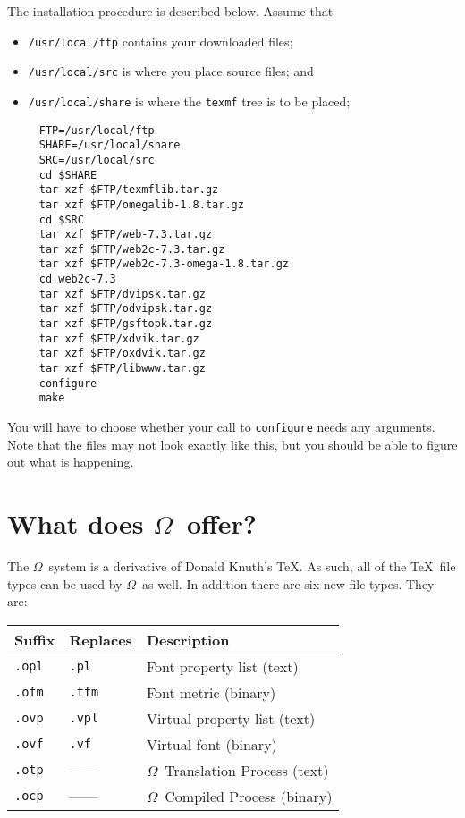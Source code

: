 \documentclass[fleqn]{article}
\newcommand{\OMEGA}{$\Omega$}
\begin{document}
The installation procedure is described below.  Assume that
\begin{itemize}
\item \verb|/usr/local/ftp| contains your downloaded files;
\item \verb|/usr/local/src| is where you place source files; and
\item \verb|/usr/local/share| is where the \texttt{texmf} tree is
to be placed;
\end{itemize}
\begin{verbatim}
     FTP=/usr/local/ftp
     SHARE=/usr/local/share
     SRC=/usr/local/src
     cd $SHARE
     tar xzf $FTP/texmflib.tar.gz
     tar xzf $FTP/omegalib-1.8.tar.gz
     cd $SRC
     tar xzf $FTP/web-7.3.tar.gz
     tar xzf $FTP/web2c-7.3.tar.gz
     tar xzf $FTP/web2c-7.3-omega-1.8.tar.gz
     cd web2c-7.3
     tar xzf $FTP/dvipsk.tar.gz
     tar xzf $FTP/odvipsk.tar.gz
     tar xzf $FTP/gsftopk.tar.gz
     tar xzf $FTP/xdvik.tar.gz
     tar xzf $FTP/oxdvik.tar.gz
     tar xzf $FTP/libwww.tar.gz
     configure
     make
\end{verbatim}
You will have to choose whether your call to \texttt{configure}
needs any arguments.  Note that the files may not look exactly
like this, but you should be able to figure out what is happening.

\section{What does \OMEGA\ offer?}

The \OMEGA\ system is a derivative of Donald Knuth's \TeX.  As such,
all of the \TeX\ file types can be used by \OMEGA\ as well.  In
addition there are six new file types.  They are:
\vspace*{.2cm}

\begin{tabular}{lll}
Suffix & Replaces & Description\\
\hline
\texttt{.opl} & \texttt{.pl} & Font property list (text)\\
\texttt{.ofm} & \texttt{.tfm} & Font metric (binary)\\
\texttt{.ovp} & \texttt{.vpl} & Virtual property list (text)\\
\texttt{.ovf} & \texttt{.vf} & Virtual font (binary)\\
\texttt{.otp} & ------ & \OMEGA\ Translation Process (text)\\
\texttt{.ocp} & ------ & \OMEGA\ Compiled Process (binary)\\
\end{tabular}
\vspace*{.2cm}
\end{document}
